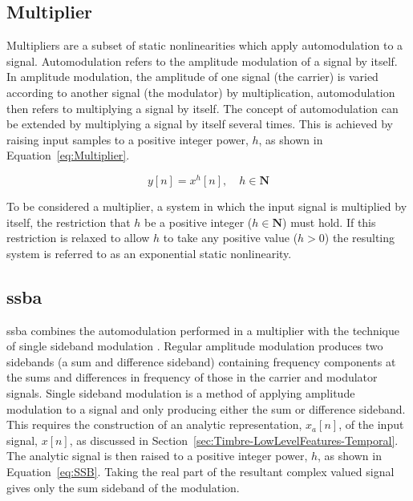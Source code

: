 	\subsection{Multiplier}
	\label{sec:Excitation-Methods-Multiplier}
		Multipliers are a subset of static nonlinearities which apply automodulation to a signal. Automodulation
		refers to the amplitude modulation of a signal by itself. In amplitude modulation, the amplitude of one
		signal (the carrier) is varied according to another signal (the modulator) by multiplication,
		automodulation then refers to multiplying a signal by itself. The concept of automodulation can be extended
		by multiplying a signal by itself several times. This is achieved by raising input samples to a positive
		integer power, $h$, as shown in Equation~\ref{eq:Multiplier}.

		\begin{equation}
			y[n] = x^{h}[n], \quad h \in \textbf{N}
			\label{eq:Multiplier}
		\end{equation}

		To be considered a multiplier, a system in which the input signal is multiplied by itself, the restriction
		that $h$ be a positive integer ($h \in \textbf{N}$) must hold. If this restriction is relaxed to allow $h$
		to take any positive value ($h > 0$) the resulting system is referred to as an exponential static
		nonlinearity.

	\subsection{\acrlong{ssba}}
	\label{sec:Excitation-Methods-SSBA}
		\acrfull{ssba} combines the automodulation performed in a multiplier with the technique of single sideband
		modulation \citep{corinthios2009signals}. Regular amplitude modulation produces two sidebands (a sum and
		difference sideband) containing frequency components at the sums and differences in frequency of those in
		the carrier and modulator signals. Single sideband modulation is a method of applying amplitude modulation
		to a signal and only producing either the sum or difference sideband. This requires the construction of an
		analytic representation, $x_{a}[n]$, of the input signal, $x[n]$, as discussed in
		Section~\ref{sec:Timbre-LowLevelFeatures-Temporal}. The analytic signal is then raised to a positive
		integer power, $h$, as shown in Equation~\ref{eq:SSB}. Taking the real part of the resultant complex valued
		signal gives only the sum sideband of the modulation.

